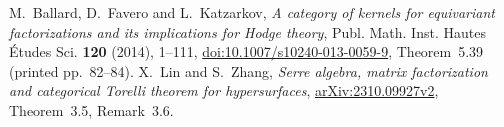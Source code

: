 M.~Ballard, D.~Favero and L.~Katzarkov,
\emph{A category of kernels for equivariant factorizations and its implications for Hodge theory},
Publ. Math. Inst. Hautes Études Sci. \textbf{120} (2014), 1--111,
\href{https://doi.org/10.1007/s10240-013-0059-9}{doi:10.1007/s10240-013-0059-9},
Theorem~5.39 (printed pp.~82--84).
X.~Lin and S.~Zhang,
\emph{Serre algebra, matrix factorization and categorical Torelli theorem for hypersurfaces},
\href{https://arxiv.org/abs/2310.09927v2}{arXiv:2310.09927v2},
Theorem~3.5, Remark~3.6.
